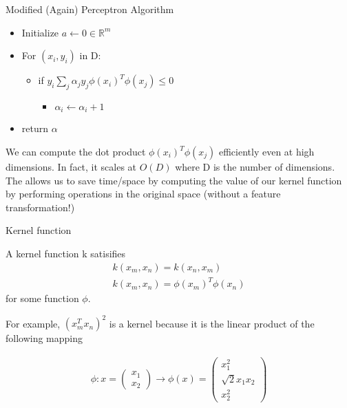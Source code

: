 Modified (Again) Perceptron Algorithm
\begin{itemize}
    \item Initialize $a \leftarrow 0 \in \mathbb{R}^{m}$
    \item For $(x_i, y_i)$ in D:
    \begin{itemize}
        \item if $y_i \sum_j \alpha_j y_j \phi(x_i)^T \phi(x_j) \leq 0$
        \begin{itemize}
            \item $\alpha_i \leftarrow \alpha_i + 1$
        \end{itemize}
    \end{itemize}
    \item return $\alpha$
\end{itemize}

We can compute the dot product $\phi(x_i)^T \phi(x_j)$ efficiently even at high dimensions. In fact, it scales at $O(D)$ where D is the number of dimensions. The  allows us to save time/space by computing the value of our kernel function by performing operations in the original space (without a feature transformation!) 

\begin{definition}
    Kernel function

    A kernel function k satisifies 
    \begin{gather*}
        k(x_m, x_n)   = k(x_n, x_m) \\
        k(x_m, x_n) = \phi(x_m)^T \phi(x_n)
    \end{gather*}
    for some function $\phi$.
    
    For example, $(x_m^Tx_n)^2$ is a kernel because it is the linear product of the following mapping

    \begin{align*}
        \phi: x = \begin{pmatrix}
            x_1 \\
            x_2
        \end{pmatrix} \rightarrow \phi(x) = \begin{pmatrix}
            x_1^2 \\
            \sqrt{2}x_1x_2 \\
            x_2^2
        \end{pmatrix}
    \end{align*}
\end{definition}
